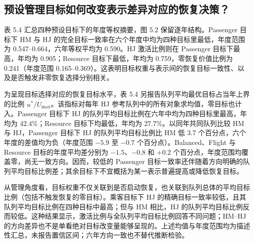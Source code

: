 \documentclass[UTF8,a4paper,11pt]{ctexart}
\numberwithin{table}{section}
\numberwithin{figure}{section}
\begin{document}
\subsection{预设管理目标如何改变表示差异对应的恢复决策？}
表 5.4 汇总四种预设目标下的年度等权摘要，图 5.2 保留逐年结构。Passenger 目标下 HM 与 HJ 的完全目标一致率在六个年度中均为四种目标里最低，年度范围为 0.547–0.664，六年等权平均为 0.590。HJ 激活比例则在 Passenger 目标下最高，年均为 0.905；Resource 目标下最低，年均为 0.759，零恢复价值比例为 0.241（年度范围 0.165–0.369）。这表明目标权重与表示间的恢复目标一致性、以及是否触发非零恢复选择分别相关。

为呈现目标选择对应的恢复目标水平，表 5.4 另报告队列平均最优目标占当年上界的比例 $\overline{u^*/U_{\max}}$。该指标对每年 HJ 参考队列中的所有对象求均值，零目标也计入。Passenger 目标下 HJ 的队列平均目标比例在六年中均为四种目标里最高，年均为 $42.4\%$；Resource 目标下均最低，年均为 $27.7\%$。以同年共同队列比较 HM 与 HJ，Passenger 目标下 HJ 的队列平均目标比例比 HM 低 3.7 个百分点，六个年度的差值均为负（年度范围 $-5.9$ 至 $-0.7$ 个百分点）。Balanced、Flight 与 Resource 目标的年度平均差分别为 $-1.5$、$-0.8$ 和 $+0.2$ 个百分点，年度范围均覆盖零，尚无一致方向。因而，较低的 Passenger 目标一致率还伴随着方向明确的队列平均目标比例差；其余目标下不宜概括为某一表示普遍提高或降低恢复目标。

从管理角度看，目标权重不仅关联到是否启动恢复，也关联到队列总体的平均目标比例（包括不触发恢复的零目标）。乘客目标下 HJ 的精确目标一致率较低，且其队列平均目标比例在四种目标中最高；但与 HM 相比，HJ 的队列平均目标比例反而较低。这种结果显示，激活比例与全队列平均目标比例回答不同问题；HM–HJ 的方向差异也不是单看绝对目标改变量能够呈现的。上述均值与年度范围均为描述性汇总，未报告置信区间；六年方向一致也不替代推断检验。
\end{document}

